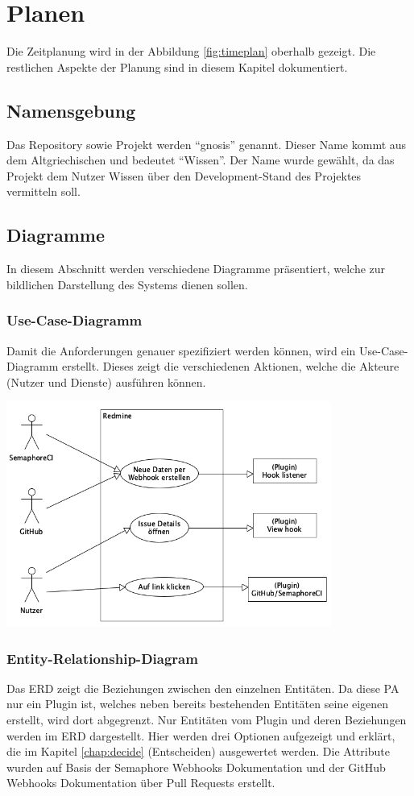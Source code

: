 \chapter{Planen}
\label{chap:plan}
Die Zeitplanung wird in der Abbildung \ref{fig:timeplan} oberhalb gezeigt. Die restlichen Aspekte der Planung sind in diesem Kapitel dokumentiert.

\section{Namensgebung}
Das Repository sowie Projekt werden \enquote{gnosis} genannt. Dieser Name kommt aus dem Altgriechischen und bedeutet
\enquote{Wissen}. Der Name wurde gewählt, da das Projekt dem Nutzer Wissen über den Development-Stand des Projektes
vermitteln soll. 

\section{Diagramme}
In diesem Abschnitt werden verschiedene Diagramme präsentiert, welche zur bildlichen Darstellung des Systems dienen sollen.
\subsection{Use-Case-Diagramm}
Damit die Anforderungen genauer spezifiziert werden können, wird ein Use-Case-Diagramm erstellt. Dieses zeigt die verschiedenen
Aktionen, welche die Akteure (Nutzer und Dienste) ausführen können.
\begin{center}
  \includegraphics[width=0.8\textwidth]{images/use-case/base.png}
  \label{fig:use_case}
\end{center}
\subsection{Entity-Relationship-Diagram}
Das ERD zeigt die Beziehungen zwischen den einzelnen Entitäten. Da diese PA nur ein Plugin ist, welches neben
bereits bestehenden Entitäten seine eigenen erstellt, wird dort abgegrenzt. Nur Entitäten vom Plugin und
deren Beziehungen werden im ERD dargestellt. \newline
Hier werden drei Optionen aufgezeigt und erklärt, die im Kapitel \ref{chap:decide} (Entscheiden) ausgewertet werden. \newline
Die Attribute wurden auf Basis der Semaphore Webhooks Dokumentation \cite{semaphore_webhooks} und der GitHub Webhooks
Dokumentation über Pull Requests \cite{github_webhooks_pr} erstellt.

